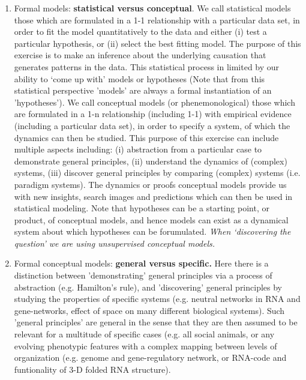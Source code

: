 \begin{enumerate}
\item Formal models:\textbf{ statistical versus conceptual}. We call statistical models those which are formulated in a 1-1 relationship with a particular data set, in order to fit the model quantitatively to the data and either (i) test a particular hypothesis, or (ii) select the best fitting model. The purpose of this exercise is to make an inference about the underlying causation that generates patterns in the data. This statistical process in limited by our ability to `come up with' models or hypotheses (Note that from this statistical perspective 'models' are always a formal instantiation of an 'hypotheses'). We call conceptual models (or phenemonological) those which are formulated in a 1-n relationship (including 1-1) with empirical evidence (including a particular data set), in order to specify a system, of which the dynamics can then be studied. This purpose of this exercise can include multiple aspects including: (i) abstraction from a particular case to demonstrate general principles, (ii) understand the dynamics of (complex) systems, (iii) discover general principles by comparing (complex) systems (i.e. paradigm systems). The dynamics or proofs conceptual models provide us with new insights, search images and predictions which can then be used in statistical modeling. Note that hypotheses can be a starting point, or product, of conceptual models, and hence models can exist as a dynamical system about which hypotheses can be forumulated. \textit{When `discovering the question' we are using unsupervised  conceptual models.} 
\item Formal conceptual models: \textbf{general versus specific.} Here there is a distinction between 'demonstrating' general principles via a process of abstraction (e.g. Hamilton's rule), and 'discovering' general principles by studying the properties of specific systems (e.g. neutral networks in RNA and gene-networks, effect of space on many different biological systems). Such 'general principles' are general in the sense that they are then assumed to be relevant for a multitude of specific cases (e.g. all social animals, or any evolving phenotypic features with a complex mapping between levels of organization (e.g. genome and gene-regulatory network, or RNA-code and funtionality of 3-D folded RNA structure).  
\end{enumerate}  
  